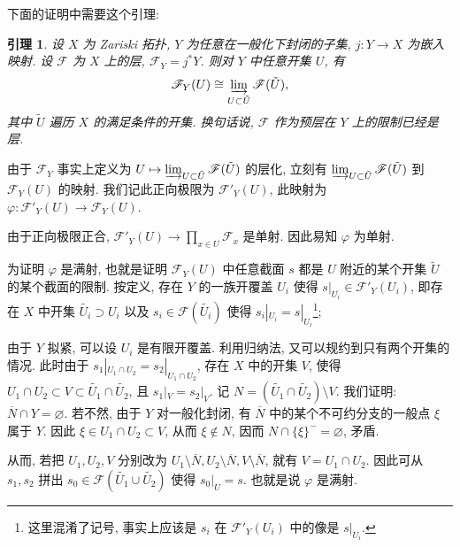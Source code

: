 \documentclass{article}
\theoremstyle{exercise}
\theoremstyle{plain}
\newtheorem*{lemma*}{引理}
\theoremstyle{remark}
\newenvironment{proofc}{\proof}{\endproof}
\def\printfootnotes{}
\def\sF{\mathscr{F}}
\def\clearfootnotes{}
\begin{document}
下面的证明中需要这个引理:
\begin{lemma*}
  设 $X$ 为 Zariski 拓扑, $Y$ 为任意在一般化下封闭的子集, $j \colon Y \to X$ 为嵌入映射.
  设 $\sF$ 为 $X$ 上的层, $\sF_Y = j^*Y$. 则对 $Y$ 中任意开集 $U$, 有
  \[
    \sF_Y(U) \cong \varinjlim_{U \subset \tilde{U}} \sF(\tilde{U}),
  \]
  其中 $\tilde{U}$ 遍历 $X$ 的满足条件的开集.
  换句话说, $\sF$ 作为预层在 $Y$ 上的限制已经是层.
\end{lemma*}

\begin{proofc}
  由于 $\sF_Y$ 事实上定义为 $U \mapsto \varinjlim_{U \subset \tilde{U}} \sF(\tilde{U})$ 的层化,
  立刻有 $\varinjlim_{U \subset \tilde{U}} \sF(\tilde{U})$ 到 $\sF_Y(U)$ 的映射.
  我们记此正向极限为 $\sF'_Y(U)$, 此映射为 $\varphi \colon \sF'_Y(U) \to \sF_Y(U)$.

  由于正向极限正合, $\sF'_Y(U) \to \prod_{x \in U} \sF_x$ 是单射. 因此易知 $\varphi$ 为单射.

  为证明 $\varphi$ 是满射, 也就是证明 $\sF_Y(U)$ 中任意截面 $s$ 都是 $U$ 附近的某个开集 $\tilde{U}$ 的某个截面的限制.
  按定义, 存在 $Y$ 的一族开覆盖 $U_i$ 使得 $s|_{U_i} \in \sF'_Y(U_i)$,
  即存在 $X$ 中开集 $\tilde{U_i} \supset U_i$ 以及 $s_i \in \sF(\tilde{U_i})$
  使得 $s_i|_{U_i} = s|_{U_i}$\footnote{这里混淆了记号, 事实上应该是 $s_i$ 在 $\sF'_Y(U_i)$ 中的像是 $s|_{U_i}$.};

  由于 $Y$ 拟紧, 可以设 $U_i$ 是有限开覆盖. 利用归纳法, 又可以规约到只有两个开集的情况.
  此时由于 $s_1|_{U_1 \cap U_2} = s_2|_{U_1 \cap U_2}$, 存在 $X$ 中的开集 $V$,
  使得 $U_1 \cap U_2 \subset V \subset \tilde{U_1} \cap \tilde{U_2}$,
  且 $s_1|_V = s_2|_V$.
  记 $N = (\tilde{U_1} \cap \tilde{U_2}) \setminus V$. 我们证明: $\overline{N} \cap Y = \varnothing$.
  若不然, 由于 $Y$ 对一般化封闭, 有 $\overline{N}$ 中的某个不可约分支的一般点 $\xi$ 属于 $Y$.
  因此 $\xi \in U_1 \cap U_2 \subset V$, 从而 $\xi \notin N$, 因而 $N \cap \{\xi\}^- = \varnothing$, 矛盾.

  从而, 若把 $U_1, U_2, V$ 分别改为 $U_1 \setminus \overline{N}, U_2 \setminus \overline{N}, V \setminus \overline{N}$,
  就有 $V = U_1 \cap U_2$. 因此可从 $s_1, s_2$ 拼出 $s_0 \in \sF(\tilde{U_1} \cup \tilde{U_2})$
  使得 $s_0|_U = s$. 也就是说 $\varphi$ 是满射. \qedhere
\printfootnotes
\end{proofc}
\clearfootnotes
\end{document}
